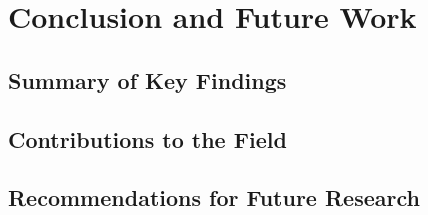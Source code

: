 \section{Conclusion and Future Work}
\subsection{Summary of Key Findings}
\subsection{Contributions to the Field}
\subsection{Recommendations for Future Research}